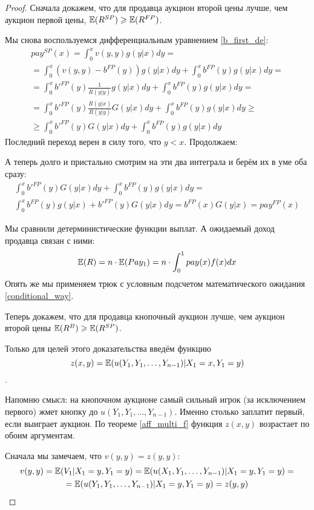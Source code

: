 \begin{proof}
Сначала докажем, что для продавца аукцион второй цены лучше, чем аукцион первой цены, $ \mathbb{E}(R^{SP})\geqslant \mathbb{E}(R^{FP}) $.


Мы снова воспользуемся дифференциальным уравнением \ref{b_first_de}:
\begin{multline}
pay^{SP}(x)=\int_{0}^{x}v(y,y)g(y|x)dy=\\
=\int_{0}^{x}(v(y,y)-b^{FP}(y))g(y|x)dy+\int_{0}^{x}b^{FP}(y)g(y|x)dy=\\
=\int_{0}^{x}b'^{FP}(y)\frac{1}{R(y|y)}g(y|x)dy+\int_{0}^{x}b^{FP}(y)g(y|x)dy=\\
=\int_{0}^{x}b'^{FP}(y)\frac{R(y|x)}{R(y|y)}G(y|x)dy+\int_{0}^{x}b^{FP}(y)g(y|x)dy\geq\\
\geq \int_{0}^{x}b'^{FP}(y)G(y|x)dy+\int_{0}^{x}b^{FP}(y)g(y|x)dy
\end{multline}
Последний переход верен в силу того, что $ y<x $. Продолжаем:

А теперь долго и пристально смотрим на эти два интеграла и берём их в уме оба сразу:
\begin{multline}
\int_{0}^{x}b'^{FP}(y)G(y|x)dy+\int_{0}^{x}b^{FP}(y)g(y|x)dy=\\
\int_{0}^{x}b^{FP}(y)g(y|x)+b'^{FP}(y)G(y|x) dy=b^{FP}(x)G(y|x)=pay^{FP}(x)
\end{multline}

Мы сравнили детерминистические функции выплат. А ожидаемый доход продавца связан с ними:
\begin{equation}
\mathbb{E}(R)=n\cdot \mathbb{E}(Pay_{1})=n\cdot \int_{0}^{1}pay(x)f(x)dx
\end{equation}
Опять же мы применяем трюк с условным подсчетом математического ожидания \ref{conditional_way}.

Теперь докажем, что для продавца кнопочный аукцион лучше, чем аукцион второй цены $ \mathbb{E}(R^{B})\geqslant \mathbb{E}(R^{SP}) $.

Только для целей этого доказательства введём функцию $$z(x,y)=\mathbb{E}(u(Y_{1},Y_{1},\ldots,Y_{n-1})|X_{1}=x,Y_{1}=y) $$.

Напомню смысл: на кнопочном аукционе самый сильный игрок (за исключением первого) жмет кнопку до $ u(Y_{1},Y_{1},\ldots,Y_{n-1}) $. Именно столько заплатит первый, если выиграет аукцион. По теореме \ref{aff_multi_f} функция $ z(x,y) $ возрастает по обоим аргументам.

Сначала мы замечаем, что $ v(y,y)=z(y,y) $:
\begin{multline}
v(y,y)=\mathbb{E}(V_{1}|X_{1}=y, Y_{1}=y)=\mathbb{E}(u(X_{1},Y_{1},\ldots,Y_{n-1})|X_{1}=y, Y_{1}=y)=\\
=\mathbb{E}(u(Y_{1},Y_{1},\ldots,Y_{n-1})|X_{1}=y, Y_{1}=y)=z(y,y)
\end{multline}


\end{proof}

